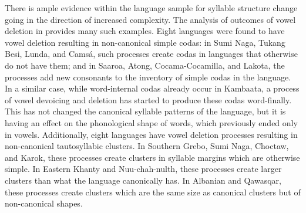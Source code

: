   There is ample evidence within the language sample for syllable structure change going in the direction of increased complexity. The analysis of outcomes of vowel deletion in  provides many such examples. Eight languages were found to have vowel deletion resulting in non-canonical simple codas: in Sumi Naga, Tukang Besi, Lunda, and Camsá, such processes create codas in languages that otherwise do not have them; and in Saaroa, Atong, Cocama-Cocamilla, and Lakota, the processes add new consonants to the inventory of simple codas in the language. In a similar case, while word-internal codas already occur in Kambaata, a process of vowel devoicing and deletion has started to produce these codas word-finally. This has not changed the canonical syllable patterns of the language, but it is having an effect on the phonological shape of words, which previously ended only in vowels. Additionally, eight languages have vowel deletion processes resulting in non-canonical tautosyllabic clusters. In Southern Grebo, Sumi Naga, Choctaw, and Karok, these processes create clusters in syllable margins which are otherwise simple. In Eastern Khanty and Nuu-chah-nulth, these processes create larger clusters than what the language canonically has. In Albanian and Qawasqar, these processes create clusters which are the same size as canonical clusters but of non-canonical shapes.

